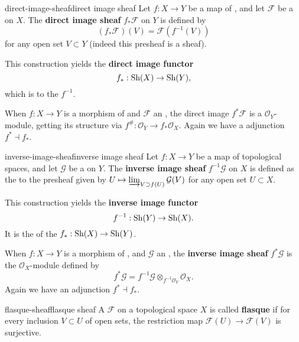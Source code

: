 \begin{topic}{direct-image-sheaf}{direct image sheaf}
    Let $f : X \to Y$ be a map of , and let $\mathcal{F}$ be a  on $X$. The \textbf{direct image sheaf} $f_* \mathcal{F}$ on $Y$ is defined by
    \[ (f_* \mathcal{F})(V) = \mathcal{F}(f^{-1}(V)) \]
    for any open set $V \subset Y$ (indeed this presheaf is a sheaf).
    
    This construction yields the \textbf{direct image functor}
    \[ f_* : \textup{Sh}(X) \to \textup{Sh}(Y) , \]
    which is  to the  $f^{-1}$.
    
    When $f : X \to Y$ is a morphism of  and $\mathcal{F}$ an , the direct image $f^* \mathcal{F}$ is a $\mathcal{O}_Y$-module, getting its structure via $f^\# : \mathcal{O}_Y \to f_* \mathcal{O}_X$. Again we have a adjunction $f^* \dashv f_*$.
\end{topic}

\begin{topic}{inverse-image-sheaf}{inverse image sheaf}
    Let $f : X \to Y$ be a map of topological spaces, and let $\mathcal{G}$ be a  on $Y$. The \textbf{inverse image sheaf} $f^
    {-1}\mathcal{G}$ on $X$ is defined as the  to the presheaf given by $U \mapsto \varinjlim_{V \supset f(U)} \mathcal{G}(V)$ for any open set $U \subset X$.
    
    This construction yields the \textbf{inverse image functor}
    \[ f^{-1} : \textup{Sh}(Y) \to \textup{Sh}(X) . \]
    It is the  of the  $f_* : \textup{Sh}(X) \to \textup{Sh}(Y)$.
    
    When $f : X \to Y$ is a morphism of , and $\mathcal{G}$ an , the \textbf{inverse image sheaf} $f^* \mathcal{G}$ is the $\mathcal{O}_X$-module defined by
    \[ f^* \mathcal{G} = f^{-1} \mathcal{G} \otimes_{f^{-1} \mathcal{O}_Y} \mathcal{O}_X . \]
    Again we have an adjunction $f^* \dashv f_*$.
\end{topic}

\begin{topic}{flasque-sheaf}{flasque sheaf}
    A  $\mathcal{F}$ on a topological space $X$ is called \textbf{flasque} if for every inclusion $V \subset U$ of open sets, the restriction map $\mathcal{F}(U) \to \mathcal{F}(V)$ is surjective.
\end{topic}

